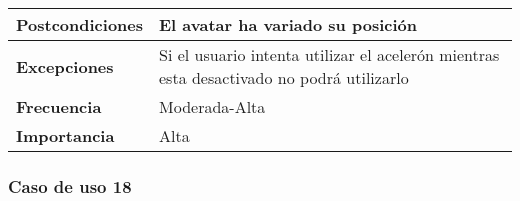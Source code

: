\begin{longtable}{l|l}
\begin{minipage}{0.25\columnwidth}
\textbf{Postcondiciones} 
\end{minipage}
&
\begin{minipage}{0.65\columnwidth}
El avatar ha variado su posición
\end{minipage}
\\ \hline

\begin{minipage}{0.25\columnwidth}
\textbf{Excepciones} 
\end{minipage}
&
\begin{minipage}{0.65\columnwidth}
Si el usuario intenta utilizar el acelerón mientras esta desactivado no podrá utilizarlo 
\end{minipage}
\\ \hline

\begin{minipage}{0.25\columnwidth}
\textbf{Frecuencia} 
\end{minipage}
&
\begin{minipage}{0.65\columnwidth}
Moderada-Alta
\end{minipage}
\\ \hline

\begin{minipage}{0.25\columnwidth}
\textbf{Importancia} 
\end{minipage}
&
\begin{minipage}{0.65\columnwidth}
Alta
\end{minipage}
\\ \hline
\end{longtable}

\subsubsection{Caso de uso 18}

